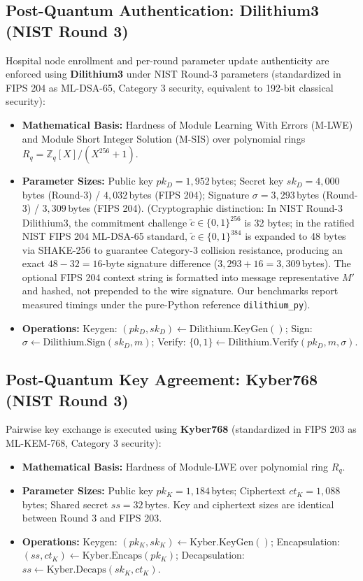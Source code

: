 \documentclass[11pt,a4paper]{report}
\begin{document}
\subsection{Post-Quantum Authentication: Dilithium3 (NIST Round 3)}
Hospital node enrollment and per-round parameter update authenticity are enforced using \textbf{Dilithium3} under NIST Round-3 parameters (standardized in FIPS 204 as ML-DSA-65, Category 3 security, equivalent to 192-bit classical security):
\begin{itemize}[itemsep=1pt]
  \item \textbf{Mathematical Basis:} Hardness of Module Learning With Errors (M-LWE) and Module Short Integer Solution (M-SIS) over polynomial rings $R_q = \mathbb{Z}_q[X]/(X^{256} + 1)$.
  \item \textbf{Parameter Sizes:} Public key $pk_D = 1{,}952$\,bytes; Secret key $sk_D = 4{,}000$\,bytes (Round-3) / $4{,}032$\,bytes (FIPS 204); Signature $\sigma = 3{,}293$\,bytes (Round-3) / $3{,}309$\,bytes (FIPS 204). (Cryptographic distinction: In NIST Round-3 Dilithium3, the commitment challenge $\tilde{c} \in \{0,1\}^{256}$ is 32 bytes; in the ratified NIST FIPS 204 ML-DSA-65 standard, $\tilde{c} \in \{0,1\}^{384}$ is expanded to 48 bytes via SHAKE-256 to guarantee Category-3 collision resistance, producing an exact $48 - 32 = 16$-byte signature difference ($3{,}293 + 16 = 3{,}309$\,bytes). The optional FIPS 204 context string is formatted into message representative $M'$ and hashed, not prepended to the wire signature. Our benchmarks report measured timings under the pure-Python reference \lstinline|dilithium_py|).
  \item \textbf{Operations:} Keygen: $(pk_D, sk_D) \leftarrow \text{Dilithium.KeyGen}()$; Sign: $\sigma \leftarrow \text{Dilithium.Sign}(sk_D, m)$; Verify: $\{0, 1\} \leftarrow \text{Dilithium.Verify}(pk_D, m, \sigma)$.
\end{itemize}

\subsection{Post-Quantum Key Agreement: Kyber768 (NIST Round 3)}
Pairwise key exchange is executed using \textbf{Kyber768} (standardized in FIPS 203 as ML-KEM-768, Category 3 security):
\begin{itemize}[itemsep=1pt]
  \item \textbf{Mathematical Basis:} Hardness of Module-LWE over polynomial ring $R_q$.
  \item \textbf{Parameter Sizes:} Public key $pk_K = 1{,}184$\,bytes; Ciphertext $ct_K = 1{,}088$\,bytes; Shared secret $ss = 32$\,bytes. Key and ciphertext sizes are identical between Round 3 and FIPS 203.
  \item \textbf{Operations:} Keygen: $(pk_K, sk_K) \leftarrow \text{Kyber.KeyGen}()$; Encapsulation: $(ss, ct_K) \leftarrow \text{Kyber.Encaps}(pk_K)$; Decapsulation: $ss \leftarrow \text{Kyber.Decaps}(sk_K, ct_K)$.
\end{itemize}
\end{document}
